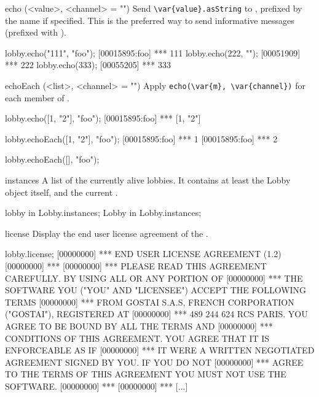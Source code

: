 \begin{urbiscriptapi}
\item[echo](<value>, <channel> = "")%
  Send \lstinline|\var{value}.asString| to \this, prefixed
  by the   name if specified.  This is
  the preferred way to send informative messages (prefixed with
  \samp{***}).
\begin{urbiscript}
lobby.echo("111", "foo");
[00015895:foo] *** 111
lobby.echo(222, "");
[00051909] *** 222
lobby.echo(333);
[00055205] *** 333
\end{urbiscript}

\item[echoEach](<list>, <channel> = "")%
  Apply \lstinline|echo(\var{m}, \var{channel})| for each member  of
  .
\begin{urbiscript}
lobby.echo([1, "2"], "foo");
[00015895:foo] *** [1, "2"]

lobby.echoEach([1, "2"], "foo");
[00015895:foo] *** 1
[00015895:foo] *** 2

lobby.echoEach([], "foo");
\end{urbiscript}


\item[instances]
  A list of the currently alive lobbies.  It contains at least the Lobby
  object itself, and the current .
\begin{urbiassert}
lobby in Lobby.instances;
Lobby in Lobby.instances;
\end{urbiassert}

\item[license]
  Display the end user license agreement of the \usdk.
\begin{urbiunchecked}
lobby.license;
[00000000] *** END USER LICENSE AGREEMENT (1.2)
[00000000] ***
[00000000] *** PLEASE READ THIS AGREEMENT CAREFULLY.  BY USING ALL OR ANY PORTION OF
[00000000] *** THE SOFTWARE YOU ("YOU" AND "LICENSEE") ACCEPT THE FOLLOWING TERMS
[00000000] *** FROM GOSTAI S.A.S, FRENCH CORPORATION ("GOSTAI"), REGISTERED AT
[00000000] *** 489 244 624 RCS PARIS.  YOU AGREE TO BE BOUND BY ALL THE TERMS AND
[00000000] *** CONDITIONS OF THIS AGREEMENT.  YOU AGREE THAT IT IS ENFORCEABLE AS IF
[00000000] *** IT WERE A WRITTEN NEGOTIATED AGREEMENT SIGNED BY YOU.  IF YOU DO NOT
[00000000] *** AGREE TO THE TERMS OF THIS AGREEMENT YOU MUST NOT USE THE SOFTWARE.
[00000000] ***
[00000000] *** [...]
\end{urbiunchecked}


\end{urbiscriptapi}
